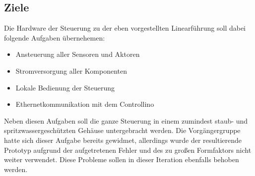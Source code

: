 \subsection{Ziele}
Die Hardware der Steuerung zu der eben vorgestellten Linearführung soll dabei folgende Aufgaben übernehemen:
\begin{itemize}
	\item Ansteuerung aller Sensoren und Aktoren
	\item Stromversorgung aller Komponenten
	\item Lokale Bedienung der Steuerung
	\item Ethernetkommunikation mit dem Controllino
\end{itemize}

\noindent Neben diesen Aufgaben soll die ganze Steuerung in einem zumindest staub- und spritzwassergeschützten Gehäuse untergebracht werden. Die Vorgängergruppe hatte sich dieser Aufgabe bereits gewidmet, allerdings wurde der resultierende Prototyp aufgrund der aufgetretenen Fehler und des zu großen Formfaktors nicht weiter verwendet. Diese Probleme sollen in dieser Iteration ebenfalls behoben werden.

%

